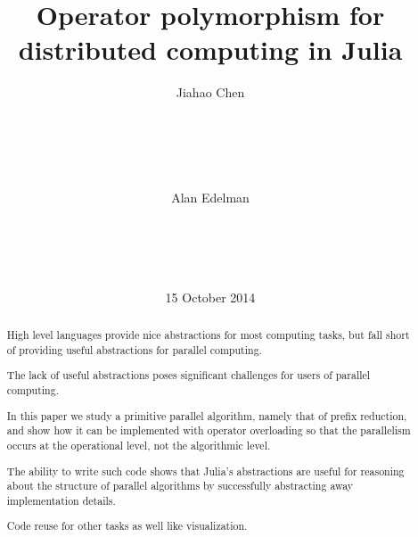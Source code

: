 \documentclass{sig-alternate}
\begin{document}
%

\title{Operator polymorphism for distributed computing in Julia}


\author{
\alignauthor
Jiahao Chen\\
       \\
       \\
       \\
       \\
       \\
\alignauthor
Alan Edelman\\
       \\
       \\
       \\
       \\
}

\date{15 October 2014}

\maketitle
\begin{abstract}
High level languages provide nice abstractions for most computing tasks, but fall short of providing useful abstractions for parallel computing.

The lack of useful abstractions poses significant challenges for users of parallel computing.

In this paper we study a primitive parallel algorithm, namely that of prefix reduction, and show how it can be implemented with operator overloading so that the parallelism occurs at the operational level, not the algorithmic level.

The ability to write such code shows that Julia's abstractions are useful for reasoning about the structure of parallel algorithms by successfully abstracting away implementation details.

Code reuse for other tasks as well like visualization.

\end{abstract}
\end{document}
